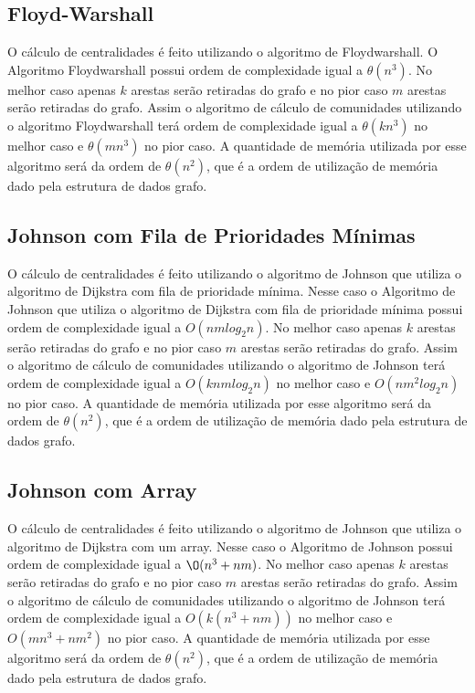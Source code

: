 \subsection{Floyd-Warshall}\label{sec:floydwarshall}
O cálculo de centralidades é feito utilizando o algoritmo de Floydwarshall. O Algoritmo Floydwarshall
possui ordem de complexidade igual a $\theta(n^3)$. No melhor caso apenas $k$ arestas serão retiradas do grafo e no pior
caso $m$ arestas serão retiradas do grafo. Assim o algoritmo de cálculo de comunidades utilizando o algoritmo Floydwarshall terá ordem de complexidade igual a $\theta(kn^3)$ no melhor caso e $\theta(mn^3)$ no pior caso. A quantidade
de memória utilizada por esse algoritmo será da ordem de $\theta(n^2)$, que é a ordem de utilização de memória dado pela estrutura
de dados grafo.

\subsection{Johnson com Fila de Prioridades Mínimas}\label{sec:johnson_queue}
O cálculo de centralidades é feito utilizando o algoritmo de Johnson que utiliza o algoritmo de Dijkstra\cite{cormen3nddijkstra} com fila
de prioridade mínima. Nesse caso o Algoritmo de Johnson que utiliza o algoritmo de Dijkstra com fila de prioridade mínima
possui ordem de complexidade igual a $O(nmlog_2n)$. No melhor caso apenas $k$ arestas serão retiradas do grafo e no pior
caso $m$ arestas serão retiradas do grafo. Assim o algoritmo de cálculo de comunidades utilizando o algoritmo de Johnson terá ordem de complexidade igual a $O(knmlog_2n)$ no melhor caso e $O(nm^2log_2n)$ no pior caso. A quantidade
de memória utilizada por esse algoritmo será da ordem de $\theta(n^2)$, que é a ordem de utilização de memória dado pela estrutura
de dados grafo.

\subsection{Johnson com Array}\label{sec:johnson_vector}
O cálculo de centralidades é feito utilizando o algoritmo de Johnson que utiliza o algoritmo de Dijkstra\cite{cormen3nddijkstra} com um array. Nesse caso o Algoritmo de Johnson possui ordem de complexidade igual a $\O(n^3 + nm)$. No melhor caso apenas $k$ arestas serão retiradas do grafo e no pior caso $m$ arestas serão retiradas do grafo. Assim o algoritmo de cálculo de comunidades utilizando o algoritmo de Johnson terá ordem de complexidade igual a $O(k(n^3 + nm))$ no melhor caso e $O(mn^3 + nm^2)$ no pior caso. A quantidade
de memória utilizada por esse algoritmo será da ordem de $\theta(n^2)$, que é a ordem de utilização de memória dado pela estrutura
de dados grafo.

